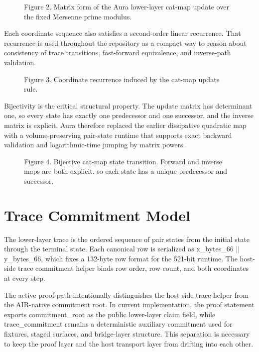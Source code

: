 \documentclass[conference]{IEEEtran}
\begin{document}
\begin{figure}[t]
\centering

\caption{Figure 2. Matrix form of the Aura lower-layer cat-map update over the fixed Mersenne prime modulus.}
\end{figure}
Each coordinate sequence also satisfies a second-order linear recurrence. That recurrence is used throughout the repository as a compact way to reason about consistency of trace transitions, fast-forward equivalence, and inverse-path validation.

\begin{figure}[t]
\centering

\caption{Figure 3. Coordinate recurrence induced by the cat-map update rule.}
\end{figure}
Bijectivity is the critical structural property. The update matrix has determinant one, so every state has exactly one predecessor and one successor, and the inverse matrix is explicit. Aura therefore replaced the earlier dissipative quadratic map with a volume-preserving pair-state runtime that supports exact backward validation and logarithmic-time jumping by matrix powers.

\begin{figure}[t]
\centering

\caption{Figure 4. Bijective cat-map state transition. Forward and inverse maps are both explicit, so each state has a unique predecessor and successor.}
\end{figure}
\section{Trace Commitment Model}
The lower-layer trace is the ordered sequence of pair states from the initial state through the terminal state. Each canonical row is serialized as x\_bytes\_66 || y\_bytes\_66, which fixes a 132-byte row format for the 521-bit runtime. The host-side trace commitment helper binds row order, row count, and both coordinates at every step.

The active proof path intentionally distinguishes the host-side trace helper from the AIR-native commitment root. In current implementation, the proof statement exports commitment\_root as the public lower-layer claim field, while trace\_commitment remains a deterministic auxiliary commitment used for fixtures, staged surfaces, and bridge-layer structure. This separation is necessary to keep the proof layer and the host transport layer from drifting into each other.
\end{document}
